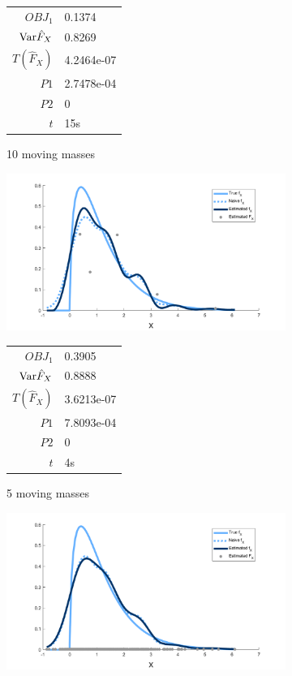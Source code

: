 \begin{figure}
\begin{subfigure}[b]{0.49\textwidth}
		\begin{tabular}{r l}
			$OBJ_1$ & 0.1374\\
			$\mathrm{Var} \hat{F}_X$ & 0.8269\\
			$T(\hat{F}_X)$ & 4.2464e-07\\
			$P1$ & 2.7478e-04\\
			$P2$ & 0\\
			$t$ & 15s
		\end{tabular}
		\caption{10 moving masses}
		\label{fig:moving masses m10 example}
	\end{subfigure}
	\begin{subfigure}[b]{0.49\textwidth}
		\centering
		\includegraphics[width = \textwidth]{Figures/Deconvolution/moving_masses_m5_example.png}
		\begin{tabular}{r l}
			$OBJ_1$ & 0.3905\\
			$\mathrm{Var} \hat{F}_X$ & 0.8888\\
			$T(\hat{F}_X)$ & 3.6213e-07\\
			$P1$ & 7.8093e-04\\
			$P2$ & 0\\
			$t$ & 4s
		\end{tabular}
		\caption{5 moving masses}
		\label{fig:moving masses m5 example}
	\end{subfigure}
	\hfill
	\begin{subfigure}[b]{0.49\textwidth}
		\centering
		\includegraphics[width = \textwidth]{Figures/Deconvolution/emp_masses_example.png}

\end{subfigure}
\end{figure}
